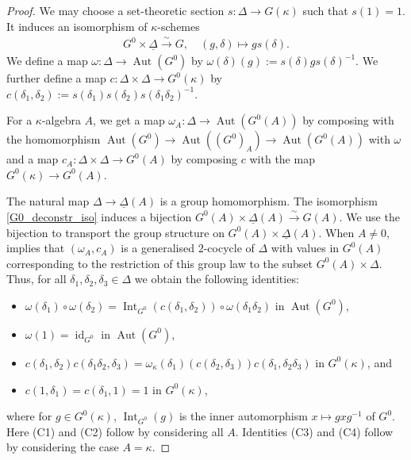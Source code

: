 \documentclass{amsart}
\theoremstyle{definition}
\theoremstyle{remark}
\DeclareMathOperator{\Aut}{Aut}
\DeclareMathOperator{\id}{id}
\newcommand{\eqto}{\xrightarrow{\sim}}
\newcommand{\Int}{\operatorname{Int}}
\begin{document}
\begin{proof} We may choose 
a set-theoretic section $s : \Delta \to G(\kappa)$ such that $s(1) = 1$. It induces an isomorphism 
of $\kappa$-schemes
    \begin{align}
        G^0 \times \underline\Delta \eqto G, \quad (g, \delta) \mapsto gs(\delta). \label{G0_deconstr_iso}
    \end{align}
    We define a map $\omega : \Delta \to \Aut(G^0)$ by $\omega(\delta)(g) := s(\delta)gs(\delta)^{-1}$. 
    We further define a map $c : \Delta \times \Delta \to G^0(\kappa)$ by $c(\delta_1,\delta_2) := s(\delta_1)s(\delta_2)s(\delta_1\delta_2)^{-1}$.
    
    For a $\kappa$-algebra $A$, we get a map $\omega_A : \Delta \to \Aut(G^0(A))$ by composing with the homomorphism $\Aut(G^0) \to \Aut((G^0)_A)\to\Aut(G^0(A))$ with $\omega$ and a map $c_A: \Delta\times \Delta \rightarrow G^0(A)$ 
    by composing $c$ with the map $G^0(\kappa) \to G^0(A)$. 
    
    The natural map $\Delta \to \underline\Delta(A)$ 
    is a group homomorphism. The isomorphism \eqref{G0_deconstr_iso} induces a bijection $G^0(A)\times \underline{\Delta}(A)\eqto G(A)$. We use the bijection to transport the group structure on 
    $G^0(A)\times \underline{\Delta}(A)$. When $A \neq 0$,  implies that 
    $(\omega_A, c_A)$ is a  generalised $2$-cocycle of $\Delta$ with values in $G^0(A)$ 
    corresponding to the restriction of this  group law to the subset $G^0(A)\times \Delta$. 
    Thus, for all $\delta_1,\delta_2, \delta_3 \in \Delta$ we obtain the following identities:
    \begin{itemize}
        \item[(C1)] $\omega(\delta_1) \circ \omega(\delta_2) = \Int_{G^0}(c(\delta_1, \delta_2)) \circ \omega(\delta_1\delta_2)$ \hspace{5pt} in $\Aut(G^0)$,
        \item[(C2)] $\omega(1) = \id_{G^0}$ \hspace{5pt} in $\Aut(G^0)$,
        \item[(C3)] $c(\delta_1,\delta_2)c(\delta_1\delta_2, \delta_3) = \omega_{\kappa}(\delta_1)(c(\delta_2, \delta_3)) c(\delta_1, \delta_2\delta_3)$ \hspace{5pt} in $G^0(\kappa)$, and
        \item[(C4)] $c(1,\delta_1) = c(\delta_1, 1) = 1$ \hspace{5pt} in $G^0(\kappa)$,
    \end{itemize}
    where for $g \in G^0(\kappa)$, $\Int_{G^0}(g)$ is the inner automorphism $x \mapsto gxg^{-1}$ of $G^0$.
    Here (C1) and (C2) follow by considering all $A$. Identities (C3) and (C4) follow by considering the case $A=\kappa$.


\end{proof}
\end{document}
